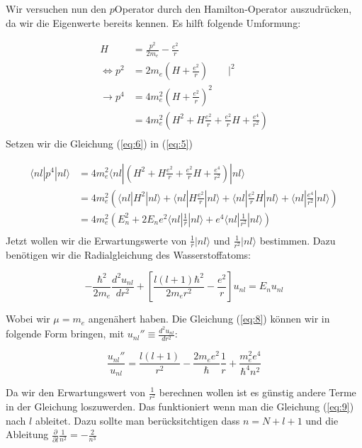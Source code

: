 Wir versuchen nun den \(p\)Operator durch den Hamilton-Operator auszudrücken, da wir die Eigenwerte bereits kennen. Es hilft folgende Umformung:


\begin{align}
  \label{eq:6}
  H &= \frac{p^2}{2m_e}-\frac{e^2}{r} \\
\Leftrightarrow p^2 &= 2m_e\left( H + \frac{e^2}{r} \right) \qquad |^2\\
\rightarrow p^4 &= 4m_e^2\left( H + \frac{e^2}{r} \right)^2\\
&= 4m_e^2\left( H^2 + H \frac{e^2}{r}+ \frac{e^2}{r}H +\frac{e^4}{r^2}  \right)\\
\end{align}
Setzen wir die Gleichung (\ref{eq:6}) in (\ref{eq:5})

\begin{align}
  \label{eq:7}
  \langle nl|p^4|nl\rangle &= 4m_e^2 \langle nl|\left( H^2 + H \frac{e^2}{r}+ \frac{e^2}{r}H +\frac{e^4}{r^2}\right) |nl\rangle \\
 &= 4m_e^2 \left(  \langle nl| H^2|nl\rangle + \langle nl| H \frac{e^2}{r}|nl\rangle+ \langle nl| \frac{e^2}{r}H|nl\rangle + \langle nl|\frac{e^4}{r^2}|nl\rangle\right)  \\
 &= 4m_e^2 \left( E_n^2 + 2E_ne^2\langle nl| \frac{1}{r}|nl\rangle + e^4\langle nl|\frac{1}{r^2}|nl\rangle\right)  \\
\end{align}
Jetzt wollen wir die Erwartungswerte von \(\frac{1}{r}|nl\rangle\) und \(\frac{1}{r^2}|nl\rangle\) bestimmen. Dazu benötigen wir die Radialgleichung des Wasserstoffatoms:

\begin{equation}
  \label{eq:8}
  -\frac{\hbar^2}{2m_e}\frac{d^2u_{nl}}{dr^2} + \left[\frac{l(l+1)\hbar^2}{2m_e r^2}-\frac{e^2}{r}\right]u_{nl} = E_n u_{nl}
\end{equation}


Wobei wir \(\mu=m_e\) angenähert haben. Die Gleichung (\ref{eq:8}) können wir in folgende Form bringen, mit \(u_{nl}'' \equiv\frac{d^2u_{nl}}{dr^2} \):

\begin{equation}
  \label{eq:9}
  \frac{u_{nl}''}{u_{nl}} = \frac{l(l+1)}{r^2} - \frac{2m_e e^2}{\hbar}\frac{1}{r}+\frac{m_e^2e^4}{\hbar^4 n^2}
\end{equation}


Da wir den Erwartungswert von \(\frac{1}{r^2}\) berechnen wollen ist es günstig andere Terme in der Gleichung loszuwerden. Das funktioniert wenn man die Gleichung (\ref{eq:9}) nach \(l\) ableitet. Dazu sollte man berücksitchtigen dass \(n=N+l+1\) und die Ableitung \(\frac{\partial}{\partial l}\frac{1}{n^2} = -\frac{2}{n^3} \)

